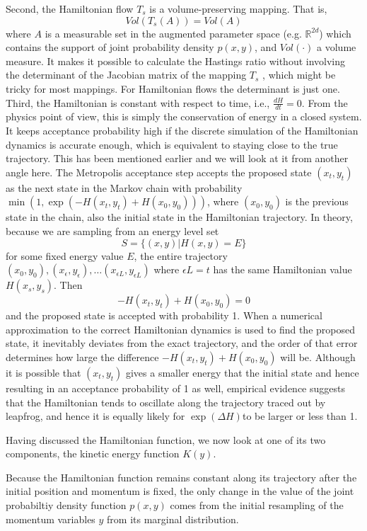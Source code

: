 \documentclass[]{report}
\begin{document}
Second, the Hamiltonian flow $T_s$ is a volume-preserving mapping. That is, 
\[ Vol(T_s(A)) = Vol(A) \]
where $A$ is a measurable set in the augmented parameter space (e.g.
$\mathbb{R}^{2d}$) which contains
the support of 
joint probability density $p(x,y)$, and $Vol(\cdot)$ a volume measure. 
It makes it
possible to calculate the Hastings ratio without involving the determinant of
the Jacobian matrix of the mapping $T_s$ , which might be tricky for most
mappings. For Hamiltonian flows the determinant is just one.
Third, the Hamiltonian is constant with respect to time, i.e., $\frac{dH}{dt} =
0$. From the physics point of view, this is simply the conservation of energy in
a closed system. It keeps acceptance probability high if the discrete simulation
of the Hamiltonian dynamics is accurate enough, which is equivalent to staying
close to the true trajectory. This has been mentioned earlier
and we will look at it from another angle here. The Metropolis acceptance step
accepts the proposed state $(x_t,y_t)$ as the next state in the Markov chain
with probability $\min(1, \exp(-H(x_t,y_t) + H(x_0,y_0)))$, where $(x_0,y_0)$ is
the previous state in the chain, also the initial state in the Hamiltonian
trajectory. In theory, because we are sampling from an energy level set 
\[ S=\{(x,y)|H(x,y)=E\} \]
for some fixed energy value $E$, the entire trajectory
$(x_0,y_0),(x_\epsilon,y_\epsilon),\dots (x_{\epsilon L},y_{\epsilon L})$ where
$\epsilon L = t $ has the same Hamiltonian value $H(x_s,y_s)$. Then 
\[ -H(x_t,y_t) + H(x_0,y_0) = 0 \]
and the proposed state is accepted with probability 1. When a numerical
approximation to the correct Hamiltonian dynamics is used to find the proposed
state, it inevitably deviates from the exact trajectory, and the order of that
error determines how large the difference $ -H(x_t,y_t) + H(x_0,y_0)$ will be.
Although it is possible that $(x_t,y_t)$ gives a smaller energy that the initial
state and hence resulting in an acceptance probability of 1 as well, empirical
evidence suggests that the Hamiltonian tends to oscillate along the trajectory
traced out by leapfrog, and hence it is equally likely for $\exp(\Delta H)$to be
larger or less than 1. 

Having discussed the Hamiltonian function, we now look at one of its two
components, the kinetic energy function $K(y)$.  

Because the
Hamiltonian function remains constant along its trajectory after the initial
position and momentum is fixed, the only change in the value of the joint probabiltiy
density function $p(x,y)$ comes from the initial resampling of the momentum variables $y$
from its marginal distribution.
\end{document}
